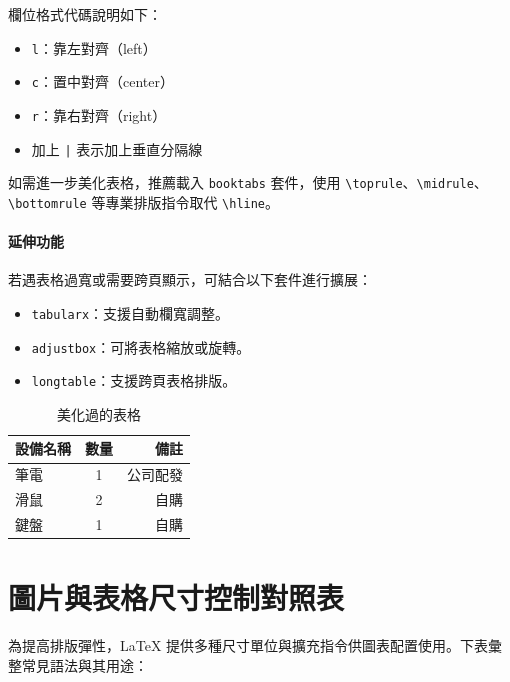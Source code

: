 欄位格式代碼說明如下：

\begin{itemize}
  \item \texttt{l}：靠左對齊（left）
  \item \texttt{c}：置中對齊（center）
  \item \texttt{r}：靠右對齊（right）
  \item 加上 \texttt{|} 表示加上垂直分隔線
\end{itemize}

如需進一步美化表格，推薦載入 \texttt{booktabs} 套件，使用 \texttt{\textbackslash toprule}、\texttt{\textbackslash midrule}、\texttt{\textbackslash bottomrule} 等專業排版指令取代 \texttt{\textbackslash hline}。

\paragraph{延伸功能}

若遇表格過寬或需要跨頁顯示，可結合以下套件進行擴展：

\begin{itemize}
  \item \texttt{tabularx}：支援自動欄寬調整。
  \item \texttt{adjustbox}：可將表格縮放或旋轉。
  \item \texttt{longtable}：支援跨頁表格排版。
\end{itemize}


\begin{table}[H]
  \centering
  \begin{tabular}{lcr}
    \toprule
    設備名稱 & 數量 & 備註 \\
    \midrule
    筆電     & 1   & 公司配發 \\
    滑鼠     & 2   & 自購 \\
    鍵盤     & 1   & 自購 \\
    \bottomrule
  \end{tabular}
  \caption{美化過的表格}
  \label{tab:equipment}
\end{table}

\section{圖片與表格尺寸控制對照表}

為提高排版彈性，LaTeX 提供多種尺寸單位與擴充指令供圖表配置使用。下表彙整常見語法與其用途：

